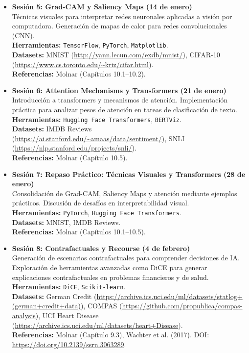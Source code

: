 \begin{itemize}
    \item \textbf{Sesión 5: Grad-CAM y Saliency Maps (14 de enero)}\\
    Técnicas visuales para interpretar redes neuronales aplicadas a visión por computadora. Generación de mapas de calor para redes convolucionales (CNN).\\
    \textbf{Herramientas:} \texttt{TensorFlow}, \texttt{PyTorch}, \texttt{Matplotlib}.\\
    \textbf{Datasets:} MNIST (\url{http://yann.lecun.com/exdb/mnist/}), CIFAR-10 (\url{https://www.cs.toronto.edu/~kriz/cifar.html}).\\
    \textbf{Referencias:} Molnar (Capítulos 10.1–10.2).

    \item \textbf{Sesión 6: Attention Mechanisms y Transformers (21 de enero)}\\
    Introducción a transformers y mecanismos de atención. Implementación práctica para analizar pesos de atención en tareas de clasificación de texto.\\
    \textbf{Herramientas:} \texttt{Hugging Face Transformers}, \texttt{BERTViz}.\\
    \textbf{Datasets:} IMDB Reviews (\url{https://ai.stanford.edu/~amaas/data/sentiment/}), SNLI (\url{https://nlp.stanford.edu/projects/snli/}).\\
    \textbf{Referencias:} Molnar (Capítulo 10.5).

    \item \textbf{Sesión 7: Repaso Práctico: Técnicas Visuales y Transformers (28 de enero)}\\
    Consolidación de Grad-CAM, Saliency Maps y atención mediante ejemplos prácticos. Discusión de desafíos en interpretabilidad visual.\\
    \textbf{Herramientas:} \texttt{PyTorch}, \texttt{Hugging Face Transformers}.\\
    \textbf{Datasets:} MNIST, IMDB Reviews.\\
    \textbf{Referencias:} Molnar (Capítulos 10.1–10.5).

    \item \textbf{Sesión 8: Contrafactuales y Recourse (4 de febrero)}\\
    Generación de escenarios contrafactuales para comprender decisiones de IA. Exploración de herramientas avanzadas como DiCE para generar explicaciones contrafactuales en problemas financieros y de salud.\\
    \textbf{Herramientas:} \texttt{DiCE}, \texttt{Scikit-learn}.\\
    \textbf{Datasets:} German Credit (\url{https://archive.ics.uci.edu/ml/datasets/statlog+(german+credit+data)}), COMPAS (\url{https://github.com/propublica/compas-analysis}), UCI Heart Disease (\url{https://archive.ics.uci.edu/ml/datasets/heart+Disease}).\\
    \textbf{Referencias:} Molnar (Capítulo 9.3), Wachter et al. (2017). DOI: \url{https://doi.org/10.2139/ssrn.3063289}.


\end{itemize}
